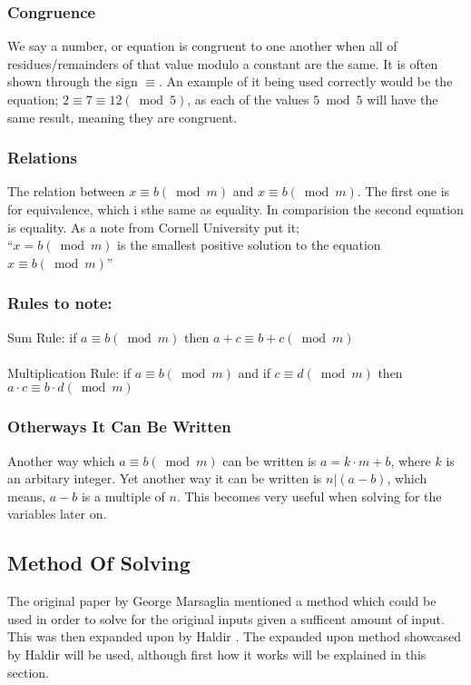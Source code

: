 \documentclass[12pft, english]{article}
\begin{document}
\begin{multicols}{2}
  \subsubsection{Congruence}
  We say a number, or equation is congruent to one another when all of residues/remainders of that value modulo a constant are the same. It is often shown through the sign \( \equiv \). An example of it being used correctly would be the equation; \( 2 \equiv 7 \equiv 12 (\bmod 5)\), as each of the values \( 5 \bmod 5\) will have the same result, meaning they are congruent. \citep{modArth}
  \subsubsection{Relations}
  The relation between \(x \equiv b (\bmod m)\) and \(x \equiv b (\bmod m )\). The first one is for equivalence, which i sthe same as equality. In comparision the second equation is equality. As a note from Cornell University put it; \\ ``\(x = b (\bmod m)\) is the smallest positive solution to the equation \( x \equiv b (\bmod m)\)'' \cite{cornelMod}
  \subsubsection{Rules to note:}
  Sum Rule: if \(a \equiv b ( \bmod m)\) then \( a + c \equiv b + c(\bmod m)\) \cite{cornelMod} \\ \\
  Multiplication Rule: if \(a \equiv b (\bmod m)\) and if \(c \equiv d (\bmod m)\) then \( a \cdot c \equiv b \cdot d (\bmod m)\)  \cite{cornelMod} \\

  \subsubsection{Otherways It Can Be Written }
  Another way which \( a \equiv b (\bmod m)\) can be written is \(a = k \cdot m + b\), where \(k\) is an arbitary integer. Yet another way it can be written is \(n | (a-b) \), which means, \(a-b\) is a multiple of \(n\). This becomes very useful when solving for the variables later on.

  \subsection{Method Of Solving }
  The original paper by George Marsaglia \citep{fallOntoPlanes} mentioned a method which could be used in order to solve for the original inputs given a sufficent amount of input. This was then expanded upon by Haldir \citep{reteamHal}. The expanded upon method showcased by Haldir will be used, although first how it works will be explained in this section.

\end{multicols}
\end{document}
